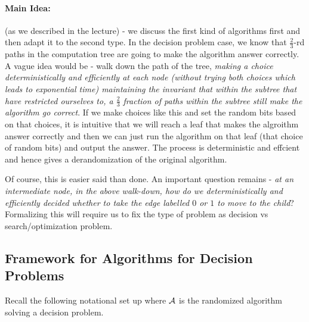 \paragraph*{Main Idea:}(as we described in the lecture) - we discuss the first kind of algorithms first and then adapt it to the second type. In the decision problem case, we know that $\frac{2}{3}$-rd paths in the computation tree are going to make the algorithm answer correctly. A vague idea would be - walk down the path of the tree, \textit{making a choice deterministically and efficiently at each node (without trying both choices which leads to exponential time) maintaining the invariant that within the subtree that have restricted ourselves to, a $\frac{2}{3}$ fraction of paths within the subtree still make the algorithm go correct}. If we make choices like this and set the random bits based on that choices, it is intuitive that we will reach a leaf that makes the algroithm answer correctly and then we can just run the algorithm on that leaf (that choice of random bits) and output the answer. The process is deterministic and effcient and hence gives a derandomization of the original algorithm.

Of course, this is easier said than done. An important question remains - \textit{at an intermediate node, in the above walk-down, how do we deterministically and efficiently decided whether to take the edge labelled $0$ or $1$ to move to the child}? Formalizing this will require us to fix the type of problem as decision vs search/optimization problem.

\subsection{Framework for Algorithms for Decision Problems}

Recall the following notational set up where ${\cal A}$ is the randomized algorithm solving a decision problem.

